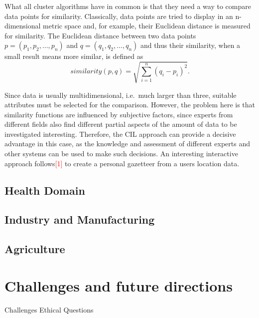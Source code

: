 \documentclass[conference,compsoc]{IEEEtran}
\newcommand\notes[1]{\textcolor{red}{#1}}
\begin{document}
What all cluster algorithms have in common is that they need a way to compare data points for similarity.
Classically, data points are tried to display in an n-dimensional metric space and, for example, their Euclidean distance is measured for similarity.
The Euclidean distance between two data points $p = (p_1, p_2, \dots, p_n)$ and $q = (q_1, q_2, \dots, q_n)$ and thus their
similarity, when a small result means more similar, is defined as
\begin{equation}
    similarity(p, q) = \sqrt{\sum_{i=1}^{n} (q_i - p_i)^{2}}.
\end{equation}

Since data is usually multidimensional, i.e.\ much larger than three, suitable attributes must be selected for the comparison. 
However, the problem here is that similarity functions are influenced by subjective factors, since experts from different 
fields also find different partial aspects of the amount of data to be investigated interesting.
Therefore, the CIL approach can provide a decisive advantage in this case, as the knowledge and assessment of 
different experts and other systems can be used to make such decisions.
An interesting interactive approach follows\notes{[1]} to create a personal gazetteer from a users location data.

\subsection{Health Domain}


\subsection{Industry and Manufacturing}


\subsection{Agriculture}

\section{Challenges and future directions}
Challenges
Ethical Questions
\end{document}
